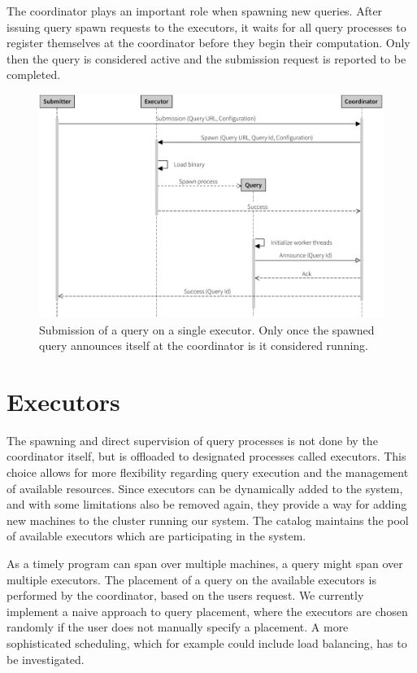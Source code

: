 The coordinator plays an important role when spawning new queries. After
issuing query spawn requests to the executors, it waits for all query processes
to register themselves at the coordinator before they begin their computation.
Only then the query is considered active and the submission request
is reported to be completed.

\begin{figure}[htb]
  \centering
    \includegraphics[width=1\textwidth]{figures/spawn_singleprocess}
  \caption[Query submission with single process.]{Submission of a query on a single executor.
  Only once the spawned query announces itself at the coordinator is it considered running.}
  \label{fig:subsingle}
\end{figure}

\section{Executors}

The spawning and direct supervision of query processes is not done by the
coordinator itself, but is offloaded to designated processes called executors.
This choice allows for more flexibility regarding query execution and the
management of available resources. Since executors can be dynamically added
to the system, and with some limitations also be removed again, they provide
a way for adding new machines to the cluster running our system. The catalog
maintains the pool of available executors which are participating in the system.

As a timely program can span over multiple machines, a query might span
over multiple executors. The placement of a query on the available executors
is performed by the coordinator, based on the users request.
We currently implement a naive approach to query placement, where the executors
are chosen randomly if the user does not manually specify a placement. A more
sophisticated scheduling, which for example could include load balancing,
has to be investigated.

